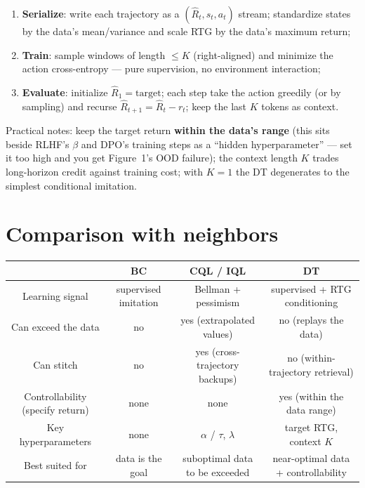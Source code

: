 \documentclass{article}
\begin{document}
\begin{enumerate}
  \item \textbf{Serialize}: write each trajectory as a $(\hat R_t, s_t, a_t)$ stream; standardize states by the data's mean/variance and scale RTG by the data's maximum return;
  \item \textbf{Train}: sample windows of length $\le K$ (right-aligned) and minimize the action cross-entropy --- pure supervision, no environment interaction;
  \item \textbf{Evaluate}: initialize $\hat R_1 = \text{target}$; each step take the action greedily (or by sampling) and recurse $\hat R_{t+1} = \hat R_t - r_t$; keep the last $K$ tokens as context.
\end{enumerate}

Practical notes: keep the target return \textbf{within the data's range} (this sits beside RLHF's $\beta$ and DPO's training steps as a ``hidden hyperparameter'' --- set it too high and you get Figure~1's OOD failure); the context length $K$ trades long-horizon credit against training cost; with $K=1$ the DT degenerates to the simplest conditional imitation.

\section*{Comparison with neighbors}

\begin{center}
\begin{tabular}{c|c|c|c}
 & \textbf{BC} & \textbf{CQL / IQL} & \textbf{DT} \\
\hline
Learning signal & supervised imitation & Bellman + pessimism & supervised + RTG conditioning \\
Can exceed the data & no & yes (extrapolated values) & no (replays the data) \\
Can stitch & no & yes (cross-trajectory backups) & no (within-trajectory retrieval) \\
Controllability (specify return) & none & none & yes (within the data range) \\
Key hyperparameters & none & $\alpha$ / $\tau$, $\lambda$ & target RTG, context $K$ \\
Best suited for & data is the goal & suboptimal data to be exceeded & near-optimal data + controllability \\
\end{tabular}
\end{center}
\end{document}
